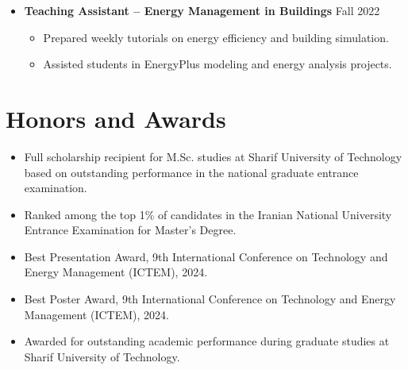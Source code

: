 \documentclass[letter,20pt]{article}
\begin{document}
\begin{itemize}
\item[]
\textbf{
Teaching Assistant -- Energy Management in Buildings
}
\hfill
Fall 2022


\begin{itemize}
[
noitemsep,
leftmargin=4ex
]

\item
Prepared weekly tutorials on energy efficiency and building simulation.

\item
Assisted students in EnergyPlus modeling and energy analysis projects.

\end{itemize}



\end{itemize}


\section{\textbf{Honors and Awards}}

\vspace{5pt}


\begin{itemize}
[
noitemsep,
topsep=5pt,
leftmargin=3ex
]


\item
Full scholarship recipient for M.Sc. studies at Sharif University of Technology based on outstanding performance in the national graduate entrance examination.


\vspace{4pt}


\item
Ranked among the top 1\% of candidates in the Iranian National University Entrance Examination for Master's Degree.


\vspace{4pt}


\item
Best Presentation Award,
9th International Conference on Technology and Energy Management (ICTEM), 2024.


\vspace{4pt}


\item
Best Poster Award,
9th International Conference on Technology and Energy Management (ICTEM), 2024.


\vspace{4pt}


\item
Awarded for outstanding academic performance during graduate studies at Sharif University of Technology.


\end{itemize}
\end{document}
